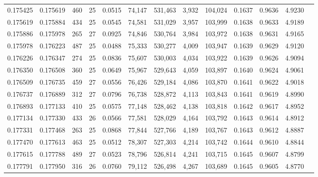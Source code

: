\begin{tabular}{rrrrrrrrrrrrr}
0.175425 & 0.175619 &   460 &  25 &                                     0.0515 &  74,147 & 531,463 &   3,932 & 104,024 & 0.1637 & 0.9636 & 4.9230 \\
0.175619 & 0.175884 &   434 &  25 &                                     0.0545 &  74,581 & 531,029 &   3,957 & 103,999 & 0.1638 & 0.9633 & 4.9189 \\
0.175886 & 0.175978 &   265 &  27 &                                     0.0925 &  74,846 & 530,764 &   3,984 & 103,972 & 0.1638 & 0.9631 & 4.9165 \\
0.175978 & 0.176223 &   487 &  25 &                                     0.0488 &  75,333 & 530,277 &   4,009 & 103,947 & 0.1639 & 0.9629 & 4.9120 \\
0.176226 & 0.176347 &   274 &  25 &                                     0.0836 &  75,607 & 530,003 &   4,034 & 103,922 & 0.1639 & 0.9626 & 4.9094 \\
0.176350 & 0.176508 &   360 &  25 &                                     0.0649 &  75,967 & 529,643 &   4,059 & 103,897 & 0.1640 & 0.9624 & 4.9061 \\
0.176509 & 0.176735 &   459 &  27 &                                     0.0556 &  76,426 & 529,184 &   4,086 & 103,870 & 0.1641 & 0.9622 & 4.9018 \\
0.176737 & 0.176889 &   312 &  27 &                                     0.0796 &  76,738 & 528,872 &   4,113 & 103,843 & 0.1641 & 0.9619 & 4.8990 \\
0.176893 & 0.177133 &   410 &  25 &                                     0.0575 &  77,148 & 528,462 &   4,138 & 103,818 & 0.1642 & 0.9617 & 4.8952 \\
0.177134 & 0.177330 &   433 &  26 &                                     0.0566 &  77,581 & 528,029 &   4,164 & 103,792 & 0.1643 & 0.9614 & 4.8912 \\
0.177331 & 0.177468 &   263 &  25 &                                     0.0868 &  77,844 & 527,766 &   4,189 & 103,767 & 0.1643 & 0.9612 & 4.8887 \\
0.177470 & 0.177613 &   463 &  25 &                                     0.0512 &  78,307 & 527,303 &   4,214 & 103,742 & 0.1644 & 0.9610 & 4.8844 \\
0.177615 & 0.177788 &   489 &  27 &                                     0.0523 &  78,796 & 526,814 &   4,241 & 103,715 & 0.1645 & 0.9607 & 4.8799 \\
0.177791 & 0.177950 &   316 &  26 &                                     0.0760 &  79,112 & 526,498 &   4,267 & 103,689 & 0.1645 & 0.9605 & 4.8770 \\

\end{tabular}
